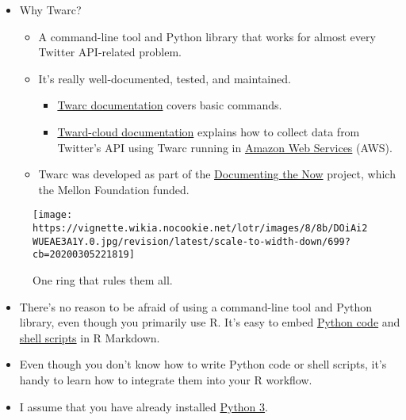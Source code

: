 \documentclass[
]{book}
\providecommand{\tightlist}{%
  \setlength{\itemsep}{0pt}\setlength{\parskip}{0pt}}
\begin{document}
\begin{itemize}
\item
  Why Twarc?

  \begin{itemize}
  \item
    A command-line tool and Python library that works for almost every Twitter API-related problem.
  \item
    It's really well-documented, tested, and maintained.

    \begin{itemize}
    \tightlist
    \item
      \href{https://scholarslab.github.io/learn-twarc/06-twarc-command-basics}{Twarc documentation} covers basic commands.
    \item
      \href{https://twarc-cloud.readthedocs.io/_/downloads/en/stable/pdf/}{Tward-cloud documentation} explains how to collect data from Twitter's API using Twarc running in \href{https://aws.amazon.com/}{Amazon Web Services} (AWS).
    \end{itemize}
  \item
    Twarc was developed as part of the \href{https://www.docnow.io/}{Documenting the Now} project, which the Mellon Foundation funded.
  \end{itemize}
\end{itemize}

\begin{figure}
\centering
\texttt{[image: https://vignette.wikia.nocookie.net/lotr/images/8/8b/DOiAi2WUEAE3A1Y.0.jpg/revision/latest/scale-to-width-down/699?cb=20200305221819]}
\caption{One ring that rules them all.}
\end{figure}

\begin{itemize}
\item
  There's no reason to be afraid of using a command-line tool and Python library, even though you primarily use R. It's easy to embed \href{https://bookdown.org/yihui/rmarkdown/language-engines.html\#python}{Python code} and \href{https://bookdown.org/yihui/rmarkdown/language-engines.html\#shell-scripts}{shell scripts} in R Markdown.
\item
  Even though you don't know how to write Python code or shell scripts, it's handy to learn how to integrate them into your R workflow.
\item
  I assume that you have already installed \href{https://www.python.org/download/releases/3.0/}{Python 3}.
\end{itemize}
\end{document}
